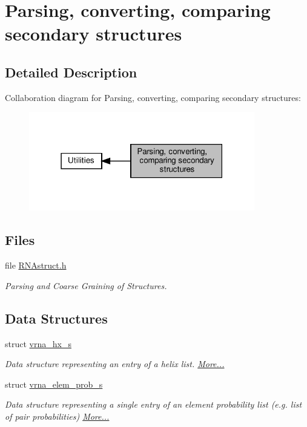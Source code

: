 \hypertarget{group__struct__utils}{}\section{Parsing, converting, comparing secondary structures}
\label{group__struct__utils}


\subsection{Detailed Description}
Collaboration diagram for Parsing, converting, comparing secondary structures\+:
\nopagebreak
\begin{figure}[H]
\begin{center}
\leavevmode
\includegraphics[width=279pt]{group__struct__utils}
\end{center}
\end{figure}
\subsection*{Files}
\begin{DoxyCompactItemize}
\item 
file \hyperlink{RNAstruct_8h}{R\+N\+Astruct.\+h}
\begin{DoxyCompactList}\small\item\em Parsing and Coarse Graining of Structures. \end{DoxyCompactList}\end{DoxyCompactItemize}
\subsection*{Data Structures}
\begin{DoxyCompactItemize}
\item 
struct \hyperlink{group__struct__utils_structvrna__hx__s}{vrna\+\_\+hx\+\_\+s}
\begin{DoxyCompactList}\small\item\em Data structure representing an entry of a helix list.  \hyperlink{group__struct__utils_structvrna__hx__s}{More...}\end{DoxyCompactList}\item 
struct \hyperlink{group__struct__utils_structvrna__elem__prob__s}{vrna\+\_\+elem\+\_\+prob\+\_\+s}
\begin{DoxyCompactList}\small\item\em Data structure representing a single entry of an element probability list (e.\+g. list of pair probabilities)  \hyperlink{group__struct__utils_structvrna__elem__prob__s}{More...}\end{DoxyCompactList}\end{DoxyCompactItemize}
